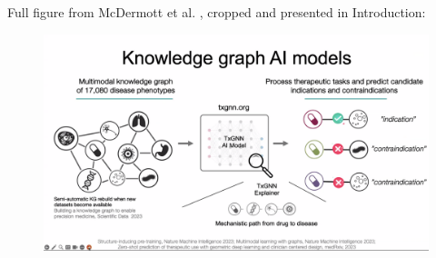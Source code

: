 \documentclass{beamer}
\begin{document}
\begin{frame}{}
    Full figure from McDermott et al. \cite{mcdermott_structure-inducing_2023}, cropped and presented in Introduction:
    \begin{figure}
        \centering
        \includegraphics[scale=0.13]{Junwei_KG_Models_Infograph.png}
    \end{figure}
\end{frame}
\end{document}

